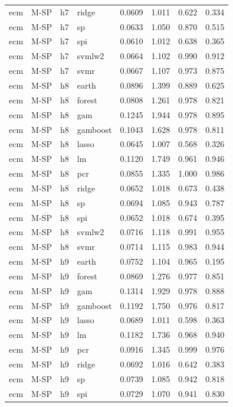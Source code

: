 \begin{ThreePartTable}
\begin{longtable}[t]{llclcccc}
ecm & M-SP & h7 & ridge & 0.0609 & 1.011 & 0.622 & 0.334\\
ecm & M-SP & h7 & sp & 0.0633 & 1.050 & 0.870 & 0.515\\
ecm & M-SP & h7 & spi & 0.0610 & 1.012 & 0.638 & 0.365\\
ecm & M-SP & h7 & svmlw2 & 0.0664 & 1.102 & 0.990 & 0.912\\
ecm & M-SP & h7 & svmr & 0.0667 & 1.107 & 0.973 & 0.875\\
\addlinespace
ecm & M-SP & h8 & earth & 0.0896 & 1.399 & 0.889 & 0.625\\
ecm & M-SP & h8 & forest & 0.0808 & 1.261 & 0.978 & 0.821\\
ecm & M-SP & h8 & gam & 0.1245 & 1.944 & 0.978 & 0.895\\
ecm & M-SP & h8 & gamboost & 0.1043 & 1.628 & 0.978 & 0.811\\
ecm & M-SP & h8 & lasso & 0.0645 & 1.007 & 0.568 & 0.326\\
ecm & M-SP & h8 & lm & 0.1120 & 1.749 & 0.961 & 0.946\\
ecm & M-SP & h8 & pcr & 0.0855 & 1.335 & 1.000 & 0.986\\
ecm & M-SP & h8 & ridge & 0.0652 & 1.018 & 0.673 & 0.438\\
ecm & M-SP & h8 & sp & 0.0694 & 1.085 & 0.943 & 0.787\\
ecm & M-SP & h8 & spi & 0.0652 & 1.018 & 0.674 & 0.395\\
ecm & M-SP & h8 & svmlw2 & 0.0716 & 1.118 & 0.991 & 0.955\\
ecm & M-SP & h8 & svmr & 0.0714 & 1.115 & 0.983 & 0.944\\
\addlinespace
ecm & M-SP & h9 & earth & 0.0752 & 1.104 & 0.965 & 0.195\\
ecm & M-SP & h9 & forest & 0.0869 & 1.276 & 0.977 & 0.851\\
ecm & M-SP & h9 & gam & 0.1314 & 1.929 & 0.978 & 0.888\\
ecm & M-SP & h9 & gamboost & 0.1192 & 1.750 & 0.976 & 0.817\\
ecm & M-SP & h9 & lasso & 0.0689 & 1.011 & 0.598 & 0.363\\
ecm & M-SP & h9 & lm & 0.1182 & 1.736 & 0.968 & 0.940\\
ecm & M-SP & h9 & pcr & 0.0916 & 1.345 & 0.999 & 0.976\\
ecm & M-SP & h9 & ridge & 0.0692 & 1.016 & 0.642 & 0.383\\
ecm & M-SP & h9 & sp & 0.0739 & 1.085 & 0.942 & 0.818\\
ecm & M-SP & h9 & spi & 0.0729 & 1.070 & 0.941 & 0.830\\

\end{longtable}
\end{ThreePartTable}
